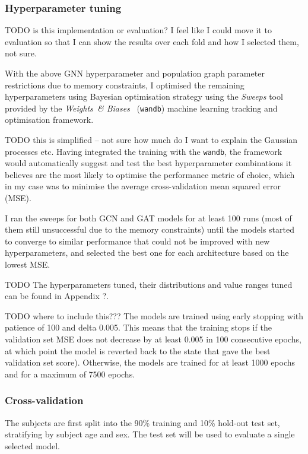 \subsubsection{Hyperparameter tuning}
TODO is this implementation or evaluation? I feel like I could move it to evaluation so that I can show the results over each fold and how I selected them, not sure.

With the above GNN hyperparameter and population graph parameter restrictions due to memory constraints, I optimised the remaining hyperparameters using Bayesian optimisation strategy using the \textit{Sweeps} tool provided by the \textit{Weights~\& Biases}~\cite{wandb} (\texttt{wandb}) machine learning tracking and optimisation framework. 

TODO this is simplified – not sure how much do I want to explain the Gaussian processes etc.
Having integrated the training with the \texttt{wandb}, the framework would automatically suggest and test the best hyperparameter combinations it believes are the most likely to optimise the performance metric of choice, which in my case was to minimise the average cross-validation mean squared error (MSE). 

I ran the sweeps for both GCN and GAT models for at least 100 runs (most of them still unsuccessful due to the memory constraints) until the models started to converge to similar performance that could not be improved with new hyperparameters, and selected the best one for each architecture based on the lowest MSE.

TODO The hyperparameters tuned, their distributions and value ranges tuned can be found in Appendix ?.

TODO where to include this??? The models are trained using early stopping with patience of 100 and delta 0.005. This means that the training stops if the validation set MSE does not decrease by at least 0.005 in 100 consecutive epochs, at which point the model is reverted back to the state that gave the best validation set score). Otherwise, the models are trained for at least 1000 epochs and for a maximum of 7500 epochs.

\subsubsection{Cross-validation}
The subjects are first split into the 90\% training and 10\% hold-out test set, stratifying by subject age and sex. The test set will be used to evaluate a single selected model. 

